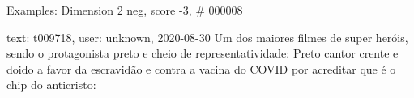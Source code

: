 \begin{frame}{Examples: Dimension 2 neg, score -3, \# 000008}
\footnotesize
\begin{alertblock}{text: t009718, user: unknown, 2020-08-30}
Um dos maiores filmes de super heróis, sendo o protagonista preto e cheio de 
representatividade:   
  Preto cantor 
crente e doido a favor da escravidão e contra a vacina do COVID por acreditar 
que é o chip do anticristo:  
\textbf{}  
\end{alertblock}
\end{frame}
